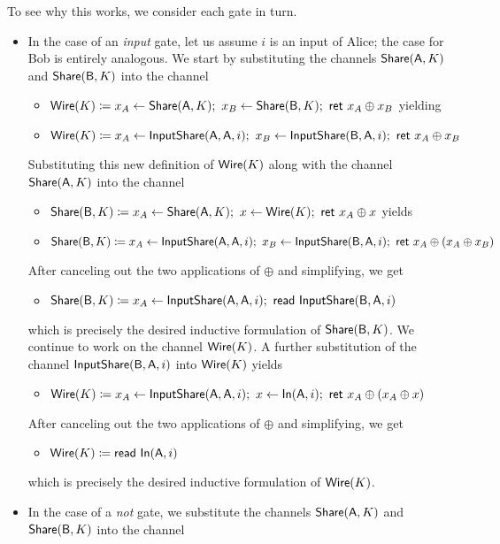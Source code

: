 \noindent To see why this works, we consider each gate in turn.
\begin{itemize}
\item In the case of an \emph{input} gate, let us assume $i$ is an input of Alice; the case for Bob is entirely analogous. We start by substituting the channels $\mathsf{Share}(\mathsf{A},K)$ and $\mathsf{Share}(\mathsf{B},K)$ into the channel
\begin{itemize}
\item $\mathsf{Wire}(K) \coloneqq x_A \leftarrow \mathsf{Share}(\mathsf{A},K); \ x_B \leftarrow \mathsf{Share}(\mathsf{B},K); \ \mathsf{ret} \ x_A \oplus x_B$ yielding
\item $\mathsf{Wire}(K) \coloneqq x_A \leftarrow \mathsf{InputShare}(\mathsf{A},\mathsf{A},i); \ x_B \leftarrow \mathsf{InputShare}(\mathsf{B},\mathsf{A},i); \ \mathsf{ret} \ x_A \oplus x_B$
\end{itemize}
Substituting this new definition of $\mathsf{Wire}(K)$ along with the channel $\mathsf{Share}(\mathsf{A},K)$ into the channel
\begin{itemize}
\item $\mathsf{Share}(\mathsf{B},K) \coloneqq x_A \leftarrow \mathsf{Share}(\mathsf{A},K); \ x \leftarrow \mathsf{Wire}(K); \ \mathsf{ret} \ x_A \oplus x$ yields
\item $\mathsf{Share}(\mathsf{B},K) \coloneqq x_A \leftarrow \mathsf{InputShare}(\mathsf{A},\mathsf{A},i); \ x_B \leftarrow \mathsf{InputShare}(\mathsf{B},\mathsf{A},i); \ \mathsf{ret} \ x_A \oplus (x_A \oplus x_B)$
\end{itemize}
After canceling out the two applications of $\oplus$ and simplifying, we get
\begin{itemize}
\item $\mathsf{Share}(\mathsf{B},K) \coloneqq x_A \leftarrow \mathsf{InputShare}(\mathsf{A},\mathsf{A},i); \ \mathsf{read} \ \mathsf{InputShare}(\mathsf{B},\mathsf{A},i)$
\end{itemize}
which is precisely the desired inductive formulation of $\mathsf{Share}(\mathsf{B},K)$. We continue to work on the channel $\mathsf{Wire}(K)$. A further substitution of the channel $\mathsf{InputShare}(\mathsf{B},\mathsf{A},i)$ into $\mathsf{Wire}(K)$ yields
\begin{itemize}
\item $\mathsf{Wire}(K) \coloneqq x_A \leftarrow \mathsf{InputShare}(\mathsf{A},\mathsf{A},i); \ x \leftarrow \mathsf{In}(\mathsf{A},i); \ \mathsf{ret} \ x_A \oplus (x_A \oplus x)$
\end{itemize}
After canceling out the two applications of $\oplus$ and simplifying, we get
\begin{itemize}
\item $\mathsf{Wire}(K) \coloneqq \mathsf{read} \ \mathsf{In}(\mathsf{A},i)$
\end{itemize}
which is precisely the desired inductive formulation of $\mathsf{Wire}(K)$.
\item In the case of a \emph{not} gate, we substitute the channels $\mathsf{Share}(\mathsf{A},K)$ and $\mathsf{Share}(\mathsf{B},K)$ into the channel

\end{itemize}
